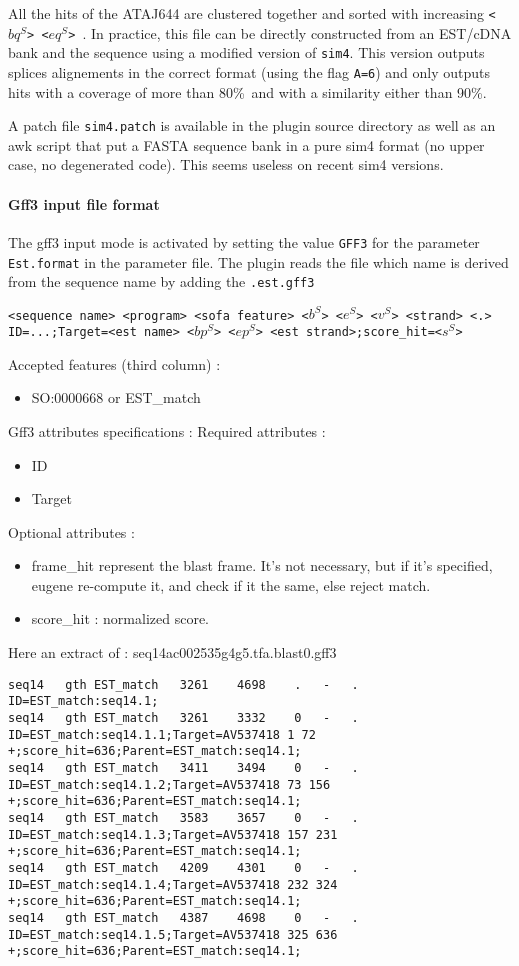 All the hits of the ATAJ644 are clustered together and sorted with
increasing \texttt{<$bq^S$> <$eq^S$> }. In practice, this file can be
directly constructed from an EST/cDNA bank and the sequence using a
modified version of \texttt{sim4}. This version outputs splices
alignements in the correct format (using the flag \texttt{A=6}) and
only outputs hits with a coverage of more than 80\%\ and with a
similarity either than 90\%.

A patch file \texttt{sim4.patch} is available in the plugin source
directory as well as an awk script that put a FASTA sequence bank in a
pure sim4 format (no upper case, no degenerated code). This seems
useless on recent sim4 versions.

\paragraph{Gff3 input file format}

The gff3 input mode is activated by setting the value \texttt{GFF3} for the parameter
\texttt{Est.format} in the parameter file.
The plugin reads the file which name is derived from the sequence name by adding the \texttt{.est.gff3}

\texttt{<sequence name> <program> <sofa feature> <$b^S$> <$e^S$> <$v^S$> <strand> <.> ID=...;Target=<est name> <$bp^S$> <$ep^S$> <est strand>;score\_hit=<$s^S$>}

Accepted features (third column) :
\begin{itemize}
\item  SO:0000668 or EST\_match
\end{itemize}


Gff3 attributes specifications :
Required attributes : 
	\begin{itemize}
	\item ID
	\item Target
	\end{itemize}
Optional attributes : 
	\begin{itemize}
	\item frame\_hit represent the blast frame. It's not necessary, 
	but if it's specified, eugene re-compute it, and check if it the same, else reject match.
	\item score\_hit :  normalized score.
	\end{itemize}


Here an extract of : seq14ac002535g4g5.tfa.blast0.gff3
\begin{Verbatim}[fontsize=\tiny]
seq14	gth	EST_match	3261	4698	.	-	.	ID=EST_match:seq14.1;
seq14	gth	EST_match	3261	3332	0	-	.	ID=EST_match:seq14.1.1;Target=AV537418 1 72 +;score_hit=636;Parent=EST_match:seq14.1;
seq14	gth	EST_match	3411	3494	0	-	.	ID=EST_match:seq14.1.2;Target=AV537418 73 156 +;score_hit=636;Parent=EST_match:seq14.1;
seq14	gth	EST_match	3583	3657	0	-	.	ID=EST_match:seq14.1.3;Target=AV537418 157 231 +;score_hit=636;Parent=EST_match:seq14.1;
seq14	gth	EST_match	4209	4301	0	-	.	ID=EST_match:seq14.1.4;Target=AV537418 232 324 +;score_hit=636;Parent=EST_match:seq14.1;
seq14	gth	EST_match	4387	4698	0	-	.	ID=EST_match:seq14.1.5;Target=AV537418 325 636 +;score_hit=636;Parent=EST_match:seq14.1;
\end{Verbatim}


